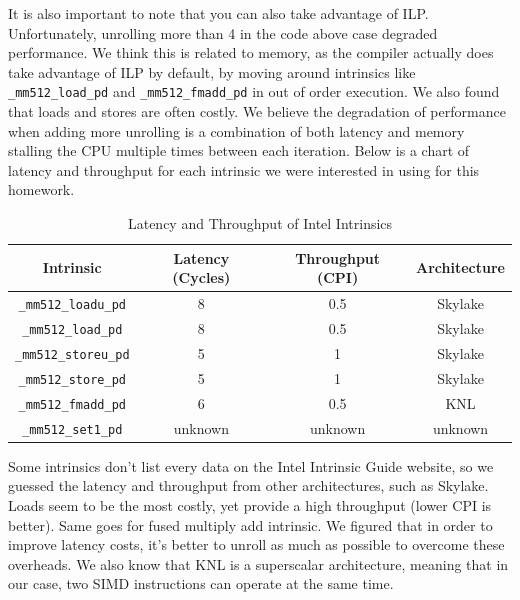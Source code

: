 \documentclass{article}
\begin{document}
It is also important to note that you can also take advantage of ILP. Unfortunately, unrolling more than 4 in the code above case degraded performance. We think this is related to memory, as the compiler actually does take advantage of ILP by default, by moving around intrinsics like \verb|_mm512_load_pd| and \verb|_mm512_fmadd_pd| in out of order execution. We also found that loads and stores are often costly. We believe the degradation of performance when adding more unrolling is a combination of both latency and memory stalling the CPU multiple times between each iteration. Below is a chart of latency and throughput for each intrinsic we were interested in using for this homework.

\begin{table}[ht]
\caption{Latency and Throughput of Intel Intrinsics} %
\centering %
\begin{tabular}{c c c c} %
\hline\hline %
Intrinsic & Latency (Cycles) & Throughput (CPI) & Architecture \\ [0.5ex] %
\hline %
\verb|_mm512_loadu_pd| & 8 & 0.5 & Skylake \\
\verb|_mm512_load_pd| & 8 & 0.5 & Skylake \\
\verb|_mm512_storeu_pd| & 5 & 1  & Skylake \\
\verb|_mm512_store_pd| & 5 & 1  & Skylake \\
\verb|_mm512_fmadd_pd| & 6 & 0.5 & KNL \\
\verb|_mm512_set1_pd| & unknown & unknown & unknown \\
[1ex] %
\hline %
\end{tabular}
\label{table:nonlin} %
\end{table}

Some intrinsics don't list every data on the Intel Intrinsic Guide website, so we guessed the latency and throughput from other architectures, such as Skylake. Loads seem to be the most costly, yet provide a high throughput (lower CPI is better). Same goes for fused multiply add intrinsic. We figured that in order to improve latency costs, it's better to unroll as much as possible to overcome these overheads. We also know that KNL is a superscalar architecture, meaning that in our case, two SIMD instructions can operate at the same time.
\end{document}
